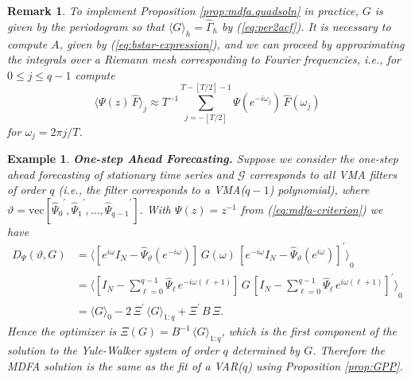 \documentclass[a4paper]{book}
\newtheorem{Example}{Example}
\newtheorem{Remark}{Remark}
\begin{document}
\begin{Remark} \rm
\label{rem:matrix.mdfa.soln}
 To implement Proposition \ref{prop:mdfa.quadsoln} in practice, $G$ is given by the
 periodogram so that ${ \langle G \rangle }_h = \widehat{\Gamma}_h$ by (\ref{eq:per2acf}).
  It is necessary to compute $A$, given by (\ref{eq:bstar-expression}), 
  and we can proceed by approximating the integrals over a Riemann mesh corresponding
 to Fourier frequencies, i.e., for $0 \leq j \leq q-1$ compute
\[
     { \langle \Psi (z) \, \widehat{F}  \rangle }_{j}  \approx 
 T^{-1} \sum_{j=-[T/2]}^{T-[T/2]-1}    \Psi (e^{-i  \omega_j }) \, \widehat{F} (\omega_j)
\]
 for $\omega_j = 2 \pi j / T$.
\end{Remark}



 
\begin{Example} {\bf One-step Ahead Forecasting.}  \rm
\label{exam:multi-step.fore.4}
  Suppose we consider the   one-step ahead forecasting of stationary time series and
 $\mathcal{G} $ corresponds to   all VMA filters of   order $q$
  (i.e., the filter corresponds to a VMA($q-1$) polynomial), where  
 $ \vartheta  = \mbox{vec} [{\widehat{\Psi}_{0} }^{\prime},
 {\widehat{\Psi}_1 }^{\prime},   \ldots,
  {\widehat{\Psi}_{q-1} }^{\prime} ]$.
 With $\Psi (z) = z^{-1}$ from (\ref{eq:mdfa-criterion}) we have 
\begin{align*}
 D_{\Psi} (\vartheta, G) & = 
 { \langle  \left[  e^{i \omega}  I_N -  \widehat{\Psi}_{\vartheta} (e^{-i \omega}) \right] \,   G (\omega) \,
  {  \left[ e^{-i \omega}  I_N  -  \widehat{\Psi}_{\vartheta} (e^{i \omega}) \right] }^{\prime} \rangle }_0 \\
 & = { \langle  \left[ I_N -  \sum_{\ell = 0}^{q-1} \widehat{\Psi}_{\ell}
    \, e^{-i \omega  (\ell+1) } \right] \, 
  G \,   {  \left[ I_N  -   \sum_{\ell = 0}^{q-1} \widehat{\Psi}_{\ell} \, e^{i \omega (\ell+1 ) } \right]
  }^{\prime} \rangle }_0 \\
 & = { \langle G \rangle }_0 - 2 \, \Xi^{\prime} \, { \langle G \rangle }_{1:q} 
    + \Xi^{\prime} \, B \, \Xi.
\end{align*}
 Hence the  optimizer is   $ \Xi (G) = B^{-1} \,    { \langle G \rangle }_{1:q}$,
 which is the first component of the solution to the Yule-Walker system of order 
  $q$ determined by $G$.
  Therefore the MDFA solution is the same as the fit of a VAR($q$) using 
 Proposition \ref{prop:GPP}.
\end{Example}
 
\end{document}
